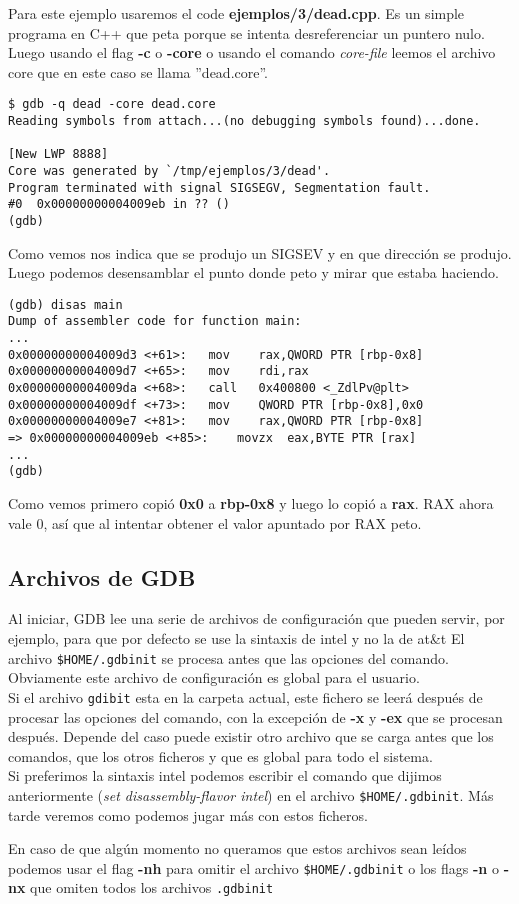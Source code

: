 Para este ejemplo usaremos el code \textbf{ejemplos/3/dead.cpp}. Es un simple programa en C++ que peta porque se intenta desreferenciar un puntero nulo.\\
Luego usando el flag \textbf{-c} o \textbf{-core} o usando el comando \emph{core-file} leemos el archivo core que en este caso se llama ''dead.core''. 
\begin{verbatim}
$ gdb -q dead -core dead.core
Reading symbols from attach...(no debugging symbols found)...done.

[New LWP 8888]
Core was generated by `/tmp/ejemplos/3/dead'.
Program terminated with signal SIGSEGV, Segmentation fault.
#0  0x00000000004009eb in ?? ()
(gdb)
\end{verbatim}
Como vemos nos indica que se produjo un SIGSEV y en que dirección se produjo.
Luego podemos desensamblar el punto donde peto y mirar que estaba haciendo.
\begin{verbatim}
(gdb) disas main
Dump of assembler code for function main:
...
0x00000000004009d3 <+61>:	mov    rax,QWORD PTR [rbp-0x8]
0x00000000004009d7 <+65>:	mov    rdi,rax
0x00000000004009da <+68>:	call   0x400800 <_ZdlPv@plt>
0x00000000004009df <+73>:	mov    QWORD PTR [rbp-0x8],0x0
0x00000000004009e7 <+81>:	mov    rax,QWORD PTR [rbp-0x8]
=> 0x00000000004009eb <+85>:	movzx  eax,BYTE PTR [rax]
...
(gdb) 
\end{verbatim}
Como vemos primero copió \textbf{0x0} a \textbf{rbp-0x8} y luego lo copió a \textbf{rax}. RAX ahora vale 0, así que al intentar obtener el valor apuntado por RAX peto.


\subsection{Archivos de GDB}
Al iniciar, GDB lee una serie de archivos de configuración que pueden servir, por ejemplo, para que por defecto se use la sintaxis de intel y no la de at\&t
El archivo \texttt{\$HOME/.gdbinit} se procesa antes que las opciones del comando. Obviamente este archivo de configuración es global para el usuario. \\
Si el archivo \texttt{gdibit} esta en la carpeta actual, este fichero se leerá después de procesar las opciones del comando, con la excepción de \textbf{-x} y \textbf{-ex} que se procesan después. Depende del caso puede existir otro archivo que se carga antes que los comandos, que los otros ficheros y que es global para todo el sistema. \\

Si preferimos la sintaxis intel podemos escribir el comando que dijimos anteriormente (\emph{set disassembly-flavor intel}) en el archivo \texttt{\$HOME/.gdbinit}. Más tarde veremos como podemos jugar más con estos ficheros.

En caso de que algún momento no queramos que estos archivos sean leídos podemos usar el flag \textbf{-nh} para omitir el archivo \texttt{\$HOME/.gdbinit} o los flags \textbf{-n} o \textbf{-nx} que omiten todos los archivos \texttt{.gdbinit}



